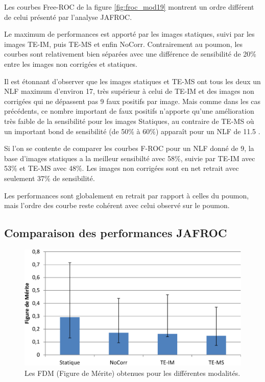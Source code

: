 Les courbes Free-ROC de la figure \ref{fig:froc_mod19} montrent un ordre différent de celui présenté par l'analyse JAFROC.

Le maximum de performances est apporté par les images statiques, suivi par les images TE-IM, puis TE-MS et enfin NoCorr. Contrairement au poumon, les courbes sont relativement bien séparées avec une différence de sensibilité de 20\% entre les images non corrigées et statiques. 

Il est étonnant d'observer que les images statiques et TE-MS ont tous les deux un NLF maximum d'environ 17, très supérieur à celui de TE-IM et des images non corrigées qui ne dépassent pas 9 faux positifs par image. Mais comme dans les cas précédents, ce nombre important de faux positifs n'apporte qu'une amélioration très faible de la sensibilité pour les images Statiques, au contraire de TE-MS où un important bond de sensibilité (de 50\% à 60\%) apparaît pour un NLF de 11.5 . 

Si l'on se contente de comparer les courbes F-ROC pour un NLF donné de 9, la base d'images statiques a la meilleur sensibilté avec 58\%, suivie par TE-IM avec 53\% et TE-MS avec 48\%. Les images non corrigées sont en net retrait avec seulement 37\% de sensibilité.

Les performances sont globalement en retrait par rapport à celles du poumon, mais l'ordre des courbe reste cohérent avec celui observé sur le poumon.


\subsection{Comparaison des performances JAFROC}

\begin{figure}[h!]
 \begin{center}
   \includegraphics[width=15cm]{images/FOM_mod19}
 \end{center}
 \caption{Les FDM (Figure de Mérite) obtenues pour les différentes modalités.}
 \label{fig:fom_mod19} 
\end{figure}


